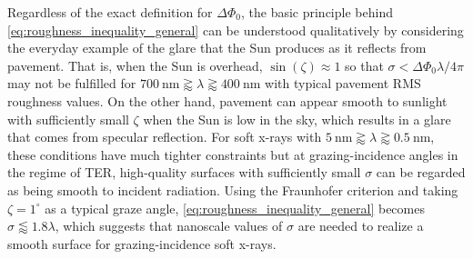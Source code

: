 Regardless of the exact definition for $\Delta \Phi_0$, the basic principle behind \cref{eq:roughness_inequality_general} can be understood qualitatively by considering the everyday example of the glare that the Sun produces as it reflects from pavement. 
That is, when the Sun is overhead, $\sin \left( \zeta \right) \approx 1$ so that $\sigma < \Delta \Phi_0 \lambda / 4 \pi$ may not be fulfilled for $\SI{700}{\nm} \gtrapprox \lambda \gtrapprox \SI{400}{\nm}$ with typical pavement RMS roughness values. 
On the other hand, pavement can appear smooth to sunlight with sufficiently small $\zeta$ when the Sun is low in the sky, which results in a glare that comes from specular reflection. 
For soft x-rays with $\SI{5}{\nm} \gtrapprox \lambda \gtrapprox \SI{0.5}{\nm}$, these conditions have much tighter constraints but at grazing-incidence angles in the regime of TER, high-quality surfaces with sufficiently small $\sigma$ can be regarded as being smooth to incident radiation. 
Using the Fraunhofer criterion and taking $\zeta = 1^{\circ}$ as a typical graze angle, \cref{eq:roughness_inequality_general} becomes $\sigma \lessapprox 1.8 \lambda$, which suggests that nanoscale values of $\sigma$ are needed to realize a smooth surface for grazing-incidence soft x-rays. 


